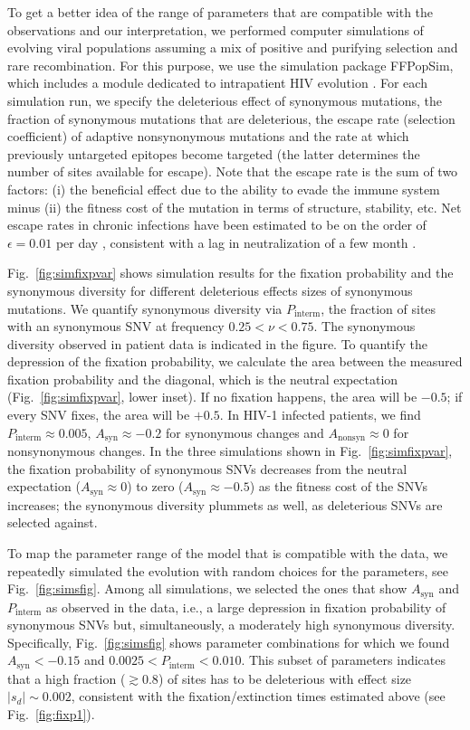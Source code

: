 \documentclass[rmp, twocolumn]{revtex4}
\newcommand{\FIG}[1]{Fig.~\ref{fig:#1}}
\begin{document}
To get a better idea of the range of parameters that are compatible with the
observations and our interpretation, we performed computer simulations of
evolving viral populations assuming a mix of positive and purifying selection
and rare recombination.  For this purpose, we use the simulation package
FFPopSim, which includes a module dedicated to intrapatient HIV evolution
\citep{zanini_ffpopsim:_2012}. For each simulation run, we specify the
deleterious effect of synonymous mutations, the fraction of synonymous mutations
that are deleterious, the escape rate (selection coefficient) of adaptive
nonsynonymous mutations and the rate at which previously untargeted epitopes
become targeted (the latter determines the number of sites available for
escape). Note that the escape rate is the sum of two factors: (i) the beneficial
effect due to the ability to evade the immune system minus (ii) the fitness cost
of the mutation in terms of structure, stability, etc. Net escape rates in
chronic infections have been estimated to be on the order of $\epsilon = 0.01$
per day \citep{neher_recombination_2010, Asquith:2006p28003}, consistent
with a lag in neutralization of a few month \citep{richman_rapid_2003}.

\FIG{simfixpvar} shows simulation results for the fixation probability and the
synonymous diversity for different deleterious effects sizes of synonymous mutations.
We quantify synonymous diversity via $P_\text{interm}$, the fraction of sites
with an synonymous SNV at frequency $0.25 < \nu < 0.75$. The synonymous diversity
observed in patient data is indicated in the figure. To quantify the depression
of the fixation probability, we calculate the area between the measured fixation
probability and the diagonal, which is the neutral expectation
(\FIG{simfixpvar}, lower inset). If no fixation happens, the area will be
$-0.5$; if every SNV fixes, the area will be $+0.5$. In HIV-1 infected
patients, we find $P_\text{interm} \approx 0.005$, $A_\text{syn} \approx -0.2$
for synonymous changes and $A_\text{nonsyn} \approx 0$ for nonsynonymous
changes. In the three simulations shown in \FIG{simfixpvar}, the fixation
probability of synonymous SNVs decreases from the neutral expectation
($A_\text{syn} \approx 0$) to zero ($A_\text{syn} \approx -0.5$) as the
fitness cost of the SNVs increases; the synonymous diversity plummets as well, as
deleterious SNVs are selected against.

To map the parameter range of the model that is compatible with the data, we
repeatedly simulated the evolution with random choices for the
parameters, see \FIG{simsfig}. Among all simulations, we selected the ones
that show $A_\text{syn}$ and $P_\text{interm}$ as observed in the data, i.e., a
large depression in fixation probability of synonymous SNVs but, simultaneously,
a moderately high synonymous diversity. Specifically, \FIG{simsfig} shows
parameter combinations for which we found $A_\text{syn} < -0.15$ and $0.0025 <
P_\text{interm} < 0.010$. This subset of parameters indicates that a high fraction
($\gtrsim 0.8$) of sites has to be deleterious with effect size $|s_d| \sim
0.002$, consistent with the fixation/extinction times estimated above
(see \FIG{fixp1}). 
\end{document}

